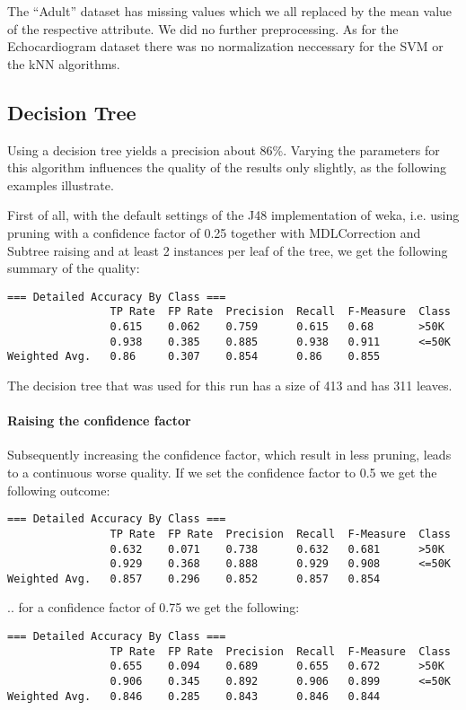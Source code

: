 \documentclass[paper=a4, fontsize=11pt]{scrartcl} %
\numberwithin{equation}{section} %
\numberwithin{figure}{section} %
\numberwithin{table}{section} %
\begin{document}
The ``Adult'' dataset has missing values which we all replaced by the mean value of the respective attribute. We did no further preprocessing. As for the Echocardiogram dataset there was no normalization neccessary for the SVM or the kNN algorithms.


\subsection{Decision Tree}
Using a decision tree yields a precision about 86\%. Varying the parameters for this algorithm influences the quality of the results only slightly, as the following examples illustrate.

First of all, with the default settings of the J48 implementation of weka, i.e. using pruning with a confidence factor of 0.25 together with MDLCorrection and Subtree raising and at least 2 instances per leaf of the tree, we get the following summary of the quality:
 
\begin{lstlisting}
=== Detailed Accuracy By Class ===
                TP Rate  FP Rate  Precision  Recall  F-Measure  Class
                0.615    0.062    0.759      0.615   0.68       >50K
                0.938    0.385    0.885      0.938   0.911      <=50K
Weighted Avg.   0.86     0.307    0.854      0.86    0.855      
\end{lstlisting}

The decision tree that was used for this run has a size of 413 and has 311 leaves.

\paragraph{Raising the confidence factor}
Subsequently increasing the confidence factor, which result in less pruning, leads to a continuous worse quality. If we set the confidence factor to 0.5 we get the following outcome:
\begin{lstlisting}
=== Detailed Accuracy By Class ===
                TP Rate  FP Rate  Precision  Recall  F-Measure  Class
                0.632    0.071    0.738      0.632   0.681      >50K
                0.929    0.368    0.888      0.929   0.908      <=50K
Weighted Avg.   0.857    0.296    0.852      0.857   0.854      
\end{lstlisting}
.. for a confidence factor of 0.75 we get the following:
\begin{lstlisting}
=== Detailed Accuracy By Class ===
                TP Rate  FP Rate  Precision  Recall  F-Measure  Class
                0.655    0.094    0.689      0.655   0.672      >50K
                0.906    0.345    0.892      0.906   0.899      <=50K
Weighted Avg.   0.846    0.285    0.843      0.846   0.844     
\end{lstlisting}
\end{document}
